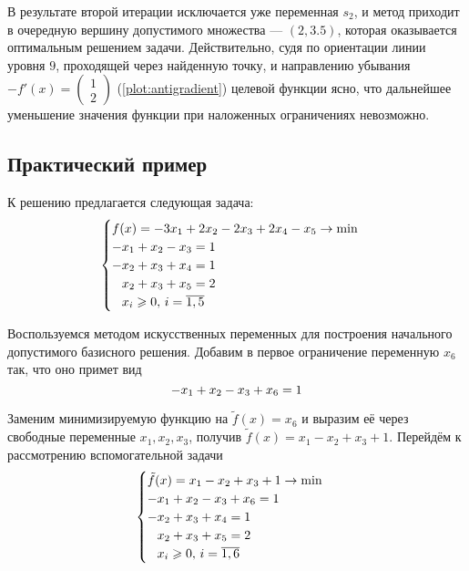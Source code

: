 В результате второй итерации исключается уже переменная $s_2$, и метод
приходит в очередную вершину допустимого множества — $(2, 3.5)$,
которая оказывается оптимальным решением задачи. Действительно, судя
по ориентации линии уровня $9$, проходящей через найденную точку, и
направлению убывания $-f'(x) =
\left(\begin{smallmatrix}1\\2\end{smallmatrix}\right)$
(\ref{plot:antigradient}) целевой функции ясно, что дальнейшее
уменьшение значения функции при наложенных ограничениях невозможно.



\clearpage
\subsection{Практический пример}

К решению предлагается следующая задача:
\begin{equation}
  \label{eq:lp-initial}
  \begin{cases}
    f(x) = -3x_1+2x_2-2x_3+2x_4-x_5 \to \min \\
    -x_1+x_2-x_3=1 \\
    -x_2+x_3+x_4=1 \\
    \phm x_2+x_3+x_5=2 \\
    \phm x_i \geq 0,\, i = \overline{1, 5}
  \end{cases}
\end{equation}

Воспользуемся методом искусственных переменных для построения
начального допустимого базисного решения. Добавим в первое ограничение
переменную $x_6$ так, что оно примет вид
\begin{equation*}
  -x_1+x_2-x_3+x_6=1 \\
\end{equation*}

Заменим минимизируемую функцию на $\tilde{f}(x) = x_6$ и выразим её
через свободные переменные $x_1, x_2, x_3$, получив
\mbox{$\tilde{f}(x) = x_1-x_2+x_3+1$}. Перейдём к рассмотрению
вспомогательной задачи
\begin{equation}
  \begin{cases}
    \tilde{f}(x) = x_1-x_2+x_3+1 \to \min \\
    -x_1+x_2-x_3+x_6=1 \\
    -x_2+x_3+x_4=1 \\
    \phm x_2+x_3+x_5=2 \\
    \phm x_i \geq 0,\, i = \overline{1, 6}
  \end{cases}
\end{equation}

